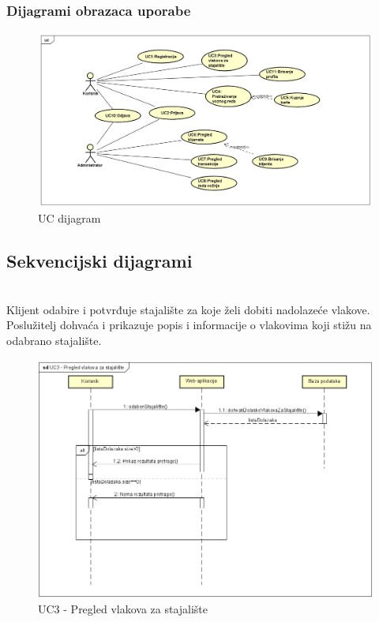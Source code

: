 				\subsubsection{Dijagrami obrazaca uporabe}
				
		
		\begin{figure}[H]
			\includegraphics[width=\textwidth]{slike/UCdiagram.PNG} %
			\caption{UC dijagram}
			\label{fig:promjene1} %
		\end{figure}
				\eject
	
					
				\eject		
				
			\subsection{Sekvencijski dijagrami}

				\noindent {}\\
				{Klijent odabire i potvrđuje stajalište za koje želi dobiti nadolazeće vlakove. Poslužitelj dohvaća i prikazuje popis i informacije o vlakovima koji stižu na odabrano stajalište.}\\
				
				\begin{figure}[H]
					\centering
					\includegraphics[width=1\linewidth]{"slike/UC3-sekvencijski"}
					\caption{UC3 - Pregled vlakova za stajalište}
					\label{fig:UC3-pregled-vlakova}
				\end{figure}
		

